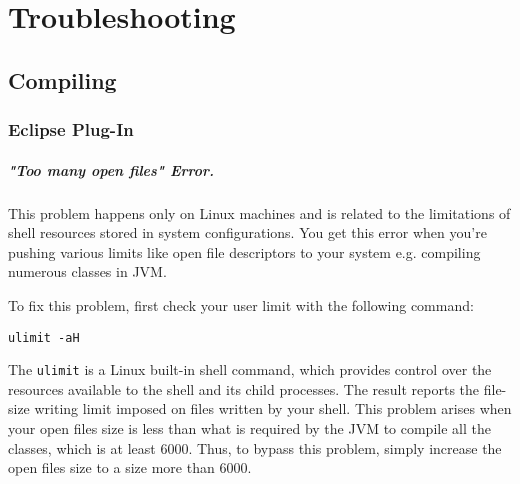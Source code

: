 \chapter{Troubleshooting}
\section{Compiling}
\subsection{Eclipse Plug-In}
\paragraph{"Too many open files" Error.} This problem happens only on Linux
machines and is related to the limitations of shell resources stored in system configurations. You get this error when you're pushing various limits like open file descriptors to your system e.g. compiling numerous classes in JVM.

To fix this problem, first check your user limit with the following command:
\begin{verbatim}
ulimit -aH
\end{verbatim}
The \texttt{ulimit} is a Linux built-in shell command, which provides control over the resources available to the shell and its child processes. The result reports the file-size  writing limit imposed on files written by your shell. This problem arises when your open files size is less than what is required by the JVM to compile all the classes, which is at least 6000. Thus, to bypass this problem, simply increase the open files size to a size more than 6000.
